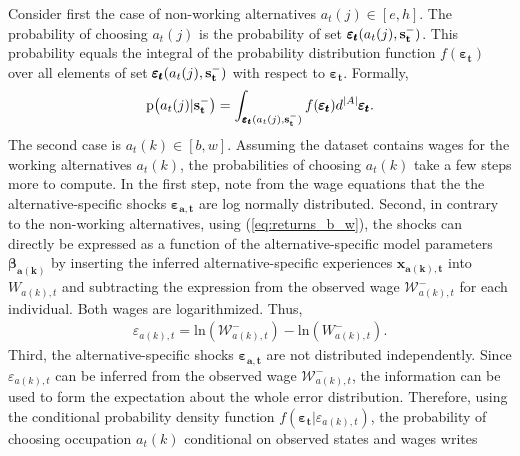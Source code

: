 Consider first the case of non-working alternatives $a_t(j) \in [e,h]$. The probability of choosing $a_t(j)$ is the probability of set $\pmb{\varepsilon_t}(a_t(j),\bold{s_t^-})$. This probability equals the integral of the probability distribution function $f(\pmb{\varepsilon_t})$ over all elements of set $\pmb{\varepsilon_t}(a_t(j),\bold{s_t^-})$ with respect to $\pmb{\varepsilon_t}$. Formally,
\begin{align}
\text{p}\big(a_t(j) | \bold{s_t^-}\big) = \int_{\pmb{\varepsilon_t}(a_t(j),\bold{s_t^-})} f(\pmb{\varepsilon_t}) d^{|A|} \pmb{\varepsilon_t}.
\end{align}
\noindent
The second case is $a_t(k) \in [b,w]$. Assuming the dataset contains wages for the working alternatives $a_t(k)$, the probabilities of choosing $a_t(k)$ take a few steps more to compute. In the first step, note from the wage equations that the the alternative-specific shocks $\pmb{\varepsilon_{a,t}}$ are log normally distributed. Second, in contrary to the non-working alternatives, using (\ref{eq:returns_b_w}), the shocks can directly be expressed as a function of the alternative-specific model parameters $\pmb{\beta_{a(k)}}$ by inserting the inferred alternative-specific experiences $\pmb{x_{a(k),t}}$ into $W_{a(k),t}$ and subtracting the expression from the observed wage $\mathcal{W}^{-}_{a(k),t}$ for each individual. Both wages are logarithmized. Thus,
\begin{align} \label{eq:epsilon}
\varepsilon_{a(k),t} = \text{ln}(\mathcal{W}^{-}_{a(k),t}) - \text{ln}(W_{a(k),t}^{-}).
\end{align}
Third, the alternative-specific shocks $\pmb{\varepsilon_{a,t}}$ are not distributed independently. Since $\varepsilon_{a(k),t}$ can be inferred from the
observed wage $\mathcal{W}^{-}_{a(k),t}$, the information can be used to form the expectation about the whole error distribution. Therefore, using the conditional probability density function $f(\pmb{\varepsilon_t}|\varepsilon_{a(k),t})$, the probability of choosing occupation $a_t(k)$ conditional on observed states and wages writes

